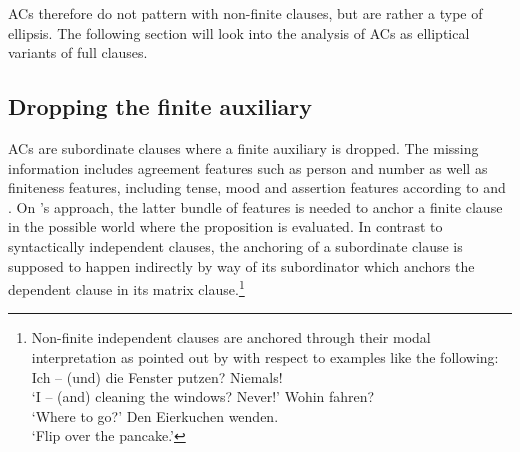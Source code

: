 \documentclass[output=paper,colorlinks,citecolor=brown]{langscibook}
\begin{document}
\noindent
ACs therefore do not pattern with non-finite clauses, but are rather a type of ellipsis. The following section will look into the analysis of ACs as elliptical variants of full clauses.
 
\subsection{Dropping the finite auxiliary \label{finiteness}}

ACs are subordinate clauses where a finite auxiliary is dropped. The missing information includes agreement features such as person and number as well as finiteness features, including tense, mood and assertion features according to \textcite{klein2006} and \textcite{repp2009}. On \textcite{repp2009}'s approach, the latter bundle of features is needed to anchor a finite clause in the possible world where the proposition is evaluated. In contrast to syntactically independent clauses, the anchoring of a subordinate clause is supposed to happen indirectly by way of its subordinator which anchors the dependent clause in its matrix clause.\footnote{Non-finite independent clauses are anchored through their modal interpretation as pointed out by \citet{reis2003} with respect to examples like the following:
\eal
\ex 
\glt Ich -- (und) die Fenster putzen? Niemals! \\ `I -- (and) cleaning the windows? Never!'
\ex 
\glt Wohin fahren? \\ `Where to go?'
\ex 
\glt Den Eierkuchen wenden. \\ `Flip over the pancake.'
\zl
} 
\end{document}
